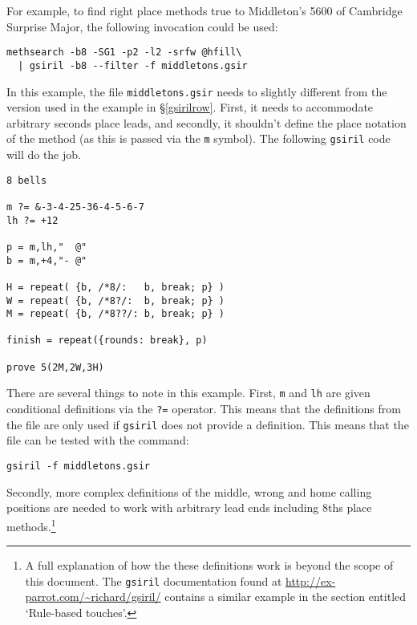 \documentclass[a4paper,11pt,oneside]{book}
\newcommand{\sref}[1]{\hyperref[#1]{\S\ref{#1}}}
\begin{document}
For example, to find right place methods true to Middleton's 5600 of 
Cambridge Surprise Major,
the following invocation could be used:%
\begin{Verbatim}[commandchars=@~~]
methsearch -b8 -SG1 -p2 -l2 -srfw @hfill\
  | gsiril -b8 --filter -f middletons.gsir
\end{Verbatim}

In this example, the file \verb+middletons.gsir+ needs to slightly different
from the version used in the example in \sref{gsirilrow}.  First, it needs
to accommodate arbitrary seconds place leads, and secondly, it shouldn't 
define the place notation of the method (as this is passed via the \verb+m+
symbol).  The following \texttt{gsiril} code will do the job.
\begin{Verbatim}
8 bells

m ?= &-3-4-25-36-4-5-6-7
lh ?= +12

p = m,lh,"  @"
b = m,+4,"- @"

H = repeat( {b, /*8/:   b, break; p} )
W = repeat( {b, /*8?/:  b, break; p} )
M = repeat( {b, /*8??/: b, break; p} )

finish = repeat({rounds: break}, p)

prove 5(2M,2W,3H)
\end{Verbatim}

There are several things to note in this example.  First, \verb+m+ and
\verb+lh+ are given conditional definitions via the \verb+?=+ operator.
This means that the definitions from the file are only used if \texttt{gsiril}
does not provide a definition.  This means that the file can be tested
with the command:

\begin{Verbatim}
gsiril -f middletons.gsir
\end{Verbatim}

Secondly, more complex definitions of the 
middle, 
wrong 
and home 
calling positions are needed
to work with arbitrary lead ends including 8ths
place methods.\footnote{A full explanation of how the these definitions work
is beyond the scope of this document.  The \texttt{gsiril} 
documentation found at \url{http://ex-parrot.com/~richard/gsiril/} contains 
a similar example in the section entitled `Rule-based touches'.}

\end{document}
